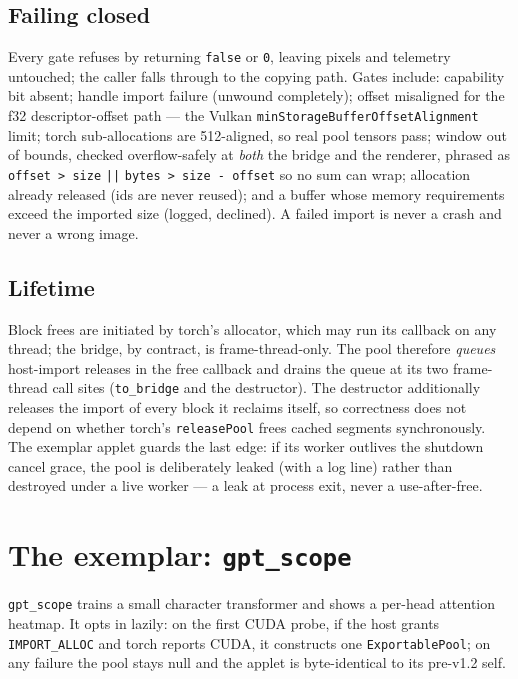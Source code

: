 \documentclass[11pt]{article}
\begin{document}
\subsection{Failing closed}
Every gate refuses by returning \texttt{false} or \texttt{0}, leaving pixels
and telemetry untouched; the caller falls through to the copying path. Gates
include: capability bit absent; handle import failure (unwound completely);
offset misaligned for the f32 descriptor-offset path --- the Vulkan
\texttt{minStorageBuffer\-OffsetAlignment} limit; torch sub-allocations are
512-aligned, so real pool tensors pass; window out of bounds, checked
overflow-safely at \emph{both} the bridge and the renderer, phrased as
\mbox{\texttt{offset > size}} \texttt{||} \mbox{\texttt{bytes > size -
offset}} so no sum can wrap; allocation already released (ids are never
reused); and a buffer whose memory requirements exceed the imported size
(logged, declined). A failed import is never a crash and never a wrong
image.

\subsection{Lifetime}
Block frees are initiated by torch's allocator, which may run its callback
on any thread; the bridge, by contract, is frame-thread-only. The pool
therefore \emph{queues} host-import releases in the free callback and drains
the queue at its two frame-thread call sites (\texttt{to\_bridge} and the
destructor). The destructor additionally releases the import of every block
it reclaims itself, so correctness does not depend on whether torch's
\texttt{releasePool} frees cached segments synchronously. The exemplar applet
guards the last edge: if its worker outlives the shutdown cancel grace, the
pool is deliberately leaked (with a log line) rather than destroyed under a
live worker --- a leak at process exit, never a use-after-free.

\section{The exemplar: \texttt{gpt\_scope}}

\texttt{gpt\_scope} trains a small character transformer and shows a
per-head attention heatmap. It opts in lazily: on the first CUDA probe, if
the host grants \texttt{IMPORT\_ALLOC} and torch reports CUDA, it constructs
one \texttt{ExportablePool}; on any failure the pool stays null and the
applet is byte-identical to its pre-v1.2 self.
\end{document}
